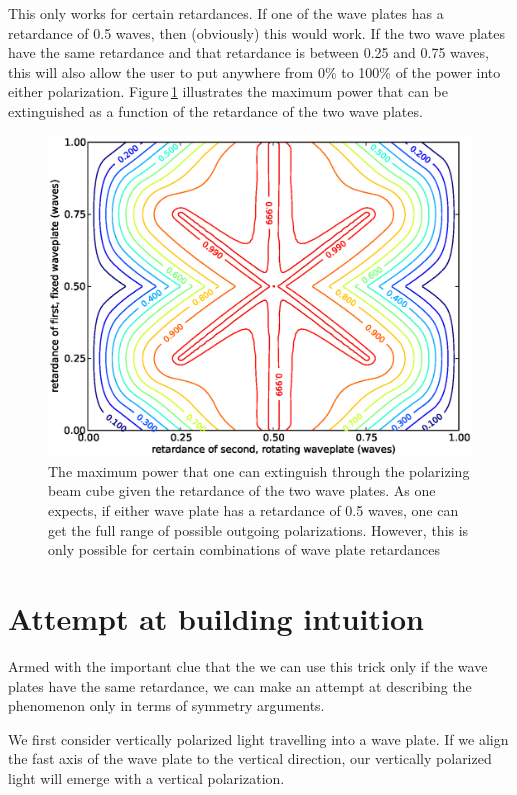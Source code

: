 This only works for certain retardances. If one of the wave plates has a retardance of 0.5 waves, then (obviously) this would work. If the two wave plates have the same retardance and that retardance is between 0.25 and 0.75 waves, this will also allow the user to put anywhere from 0\% to 100\% of the power into either polarization. Figure\,\ref{asymmetric} illustrates the maximum power that can be extinguished as a function of the retardance of the two wave plates.


\begin{figure}
    \centerline{\includegraphics[width=.9\textwidth]{NewNotesAsymmetricFigure}}
    \caption[Maximum extinguished power for various combinations of retardances]{\label{asymmetric}
   The maximum power that one can extinguish through the polarizing beam cube given the retardance of the two wave plates. As one expects, if either wave plate has a retardance of 0.5 waves, one can get the full range of possible outgoing polarizations. However, this is only possible for certain combinations of wave plate retardances}
\end{figure}

\section{Attempt at building intuition}

Armed with the important clue that the we can use this trick only if the wave plates have the same retardance, we can make an attempt at describing the phenomenon only in terms of symmetry arguments.

We first consider vertically polarized light travelling into a wave plate. If we align the fast axis of the wave plate to the vertical direction, our vertically polarized light will emerge with a vertical polarization. 

